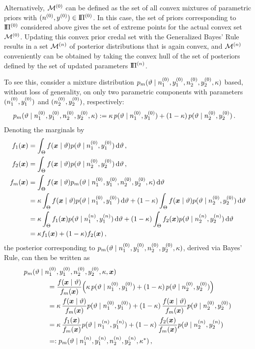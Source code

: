 Alternatively, $\mathcal{M}^{(0)}$ can be defined as the set of all convex mixtures of parametric priors with $(n^{(0)}, y^{(0)}) \in \text{I}\!\Pi^{(0)}$.
In this case, the set of priors corresponding to $\text{I}\!\Pi^{(0)}$ considered above gives the set of extreme points for the actual convex set $\mathcal{M}^{(0)}$.
Updating this convex prior credal set with the Generalized Bayes' Rule results in a set $\mathcal{M}^{(n)}$ of posterior distributions that is again convex,
and $\mathcal{M}^{(n)}$ conveniently can be obtained by taking the convex hull of the set of posteriors
defined by the set of updated parameters $\text{I}\!\Pi^{(n)}$.

To see this, consider a mixture distribution $p_m(\vartheta\mid n^{(0)}_1,y^{(0)}_1, n^{(0)}_2,y^{(0)}_2, \kappa)$
based, without loss of generality, on only two parametric components
with parameters $(n^{(0)}_1,y^{(0)}_1)$ and $(n^{(0)}_2,y^{(0)}_2)$, respectively:
\begin{align*}
p_m(\vartheta\mid n^{(0)}_1,y^{(0)}_1, n^{(0)}_2,y^{(0)}_2, \kappa) &:=
   \kappa\,  p(\vartheta\mid n^{(0)}_1,y^{(0)}_1) +
(1-\kappa)\, p(\vartheta\mid n^{(0)}_2,y^{(0)}_2) \,.
\end{align*}
Denoting the marginals by
\begin{align*}
f_1({\bm x}) &= \int_\Theta f({\bm x}\mid\vartheta) p(\vartheta\mid n^{(0)}_1,y^{(0)}_1) \,\mathrm{d}\vartheta \,, \\
f_2({\bm x}) &= \int_\Theta f({\bm x}\mid\vartheta) p(\vartheta\mid n^{(0)}_2,y^{(0)}_2) \,\mathrm{d}\vartheta \,, \\
f_m({\bm x}) &= \int_\Theta f({\bm x}\mid\vartheta) p_m(\vartheta\mid n^{(0)}_1,y^{(0)}_1, n^{(0)}_2,y^{(0)}_2, \kappa) \,\mathrm{d}\vartheta \\
        &=    \kappa  \int_\Theta f({\bm x}\mid\vartheta) p(\vartheta\mid n^{(0)}_1,y^{(0)}_1) \,\mathrm{d}\vartheta 
         + (1-\kappa) \int_\Theta f({\bm x}\mid\vartheta) p(\vartheta\mid n^{(0)}_2,y^{(0)}_2) \,\mathrm{d}\vartheta \\
        &=    \kappa  \int_\Theta f_1({\bm x}) p(\vartheta\mid n^{(n)}_1,y^{(n)}_1) \,\mathrm{d}\vartheta 
         + (1-\kappa) \int_\Theta f_2({\bm x}) p(\vartheta\mid n^{(n)}_2,y^{(n)}_2) \,\mathrm{d}\vartheta \\
        &= \kappa f_1({\bm x}) + (1-\kappa) f_2({\bm x}) \,,
\end{align*}
the posterior corresponding to $p_m(\vartheta\mid n^{(0)}_1,y^{(0)}_1, n^{(0)}_2,y^{(0)}_2, \kappa)$,
derived via Bayes' Rule, %
can then be written as
\begin{align}
\lefteqn{
p_m(\vartheta\mid \nz_1,\yz_1, \nz_2,\yz_2, \kappa, \x) } \hspace*{8ex} & \nonumber\\
 &= \frac{f(\x\mid\vartheta)}{f_m(\x)} \Big(
     \kappa\,  p(\vartheta\mid\nz_1,\yz_1) +
  (1-\kappa)\, p(\vartheta\mid\nz_2,\yz_2) \Big) \nonumber\\
 &=  \kappa\,  \frac{f(\x\mid\vartheta)}{f_m(\x)} p(\vartheta\mid\nz_1,\yz_1) +
  (1-\kappa)\, \frac{f(\x\mid\vartheta)}{f_m(\x)} p(\vartheta\mid\nz_2,\yz_2) \nonumber\\
 &=  \kappa\,  \frac{f_1(\x)}{f_m(\x)} p(\vartheta\mid\nn_1,\yn_1) +
  (1-\kappa)\, \frac{f_2(\x)}{f_m(\x)} p(\vartheta\mid\nn_2,\yn_2) \nonumber\\
 &=: p_m(\vartheta\mid \nn_1,\yn_1, \nn_2,\yn_2, \kappa^*)\,,
\label{sec:posteriormixture}
\end{align}

